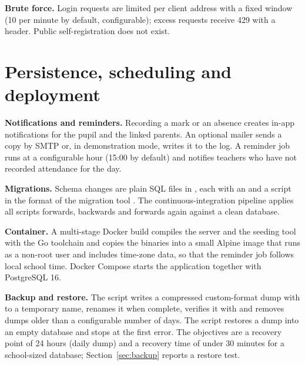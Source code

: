 \textbf{Brute force.} Login requests are limited per client address with a fixed window (10 per minute by default, configurable); excess requests receive 429 with a  header. Public self-registration does not exist.

\section{Persistence, scheduling and deployment}

\textbf{Notifications and reminders.} Recording a mark or an absence creates in-app notifications for the pupil and the linked parents. An optional mailer sends a copy by SMTP or, in demonstration mode, writes it to the log. A reminder job runs at a configurable hour (15:00 by default) and notifies teachers who have not recorded attendance for the day.

\textbf{Migrations.} Schema changes are plain SQL files in , each with an  and a  script in the format of the migration tool \cite{migrate}. The continuous-integration pipeline applies all scripts forwards, backwards and forwards again against a clean database.

\textbf{Container.} A multi-stage Docker build compiles the server and the seeding tool with the Go toolchain and copies the binaries into a small Alpine image that runs as a non-root user and includes time-zone data, so that the reminder job follows local school time. Docker Compose starts the application together with PostgreSQL 16.

\textbf{Backup and restore.} The script  writes a compressed custom-format dump with  \cite{pgdump} to a temporary name, renames it when complete, verifies it with  and removes dumps older than a configurable number of days. The script  restores a dump into an empty database and stops at the first error. The objectives are a recovery point of 24 hours (daily dump) and a recovery time of under 30 minutes for a school-sized database; Section~\ref{sec:backup} reports a restore test.
